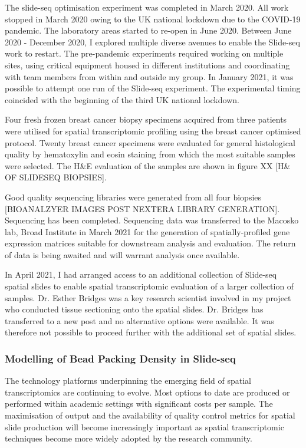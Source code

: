 The slide-seq optimisation experiment was completed in March 2020. All work stopped in March 2020 owing to the UK national lockdown due to the COVID-19 pandemic. The laboratory areas started to re-open in June 2020. Between June 2020 - December 2020, I explored multiple diverse avenues to enable the Slide-seq work to restart. The pre-pandemic experiments required working on multiple sites, using critical equipment housed in different institutions and coordinating with team members from within and outside my group. In January 2021, it was possible to attempt one run of the Slide-seq experiment. The experimental timing coincided with the beginning of the third UK national lockdown. 

Four fresh frozen breast cancer biopsy specimens acquired from three patients were utilised for spatial transcriptomic profiling using the breast cancer optimised protocol. Twenty breast cancer specimens were evaluated for general histological quality by hematoxylin and eosin  staining from which the most suitable samples were selected. The H{\&}E evaluation of the samples are shown in figure XX [H{\&} OF SLIDESEQ BIOPSIES].

Good quality sequencing libraries were generated from all four biopsies [BIOANALZYER IMAGES POST NEXTERA LIBRARY GENERATION]. Sequencing has been completed. Sequencing data was transferred to the Macosko lab, Broad Institute in March 2021 for the generation of spatially-profiled gene expression matrices suitable for downstream analysis and evaluation. The return of data is being awaited and will warrant analysis once available.

In April 2021, I had arranged access to an additional collection of Slide-seq spatial slides to enable spatial transcriptomic evaluation of a larger collection of samples. 
Dr. Esther Bridges was a key research scientist involved in my project who conducted tissue sectioning onto the spatial slides. Dr. Bridges has transferred to a new post and no alternative options were available. It was therefore not possible to proceed further with the additional set of spatial slides.


\subsubsection{Modelling of Bead Packing Density in Slide-seq}
The technology platforms underpinning the emerging field of spatial transcriptomics are continuing to evolve. Most options to date are produced or performed within academic settings with significant costs per sample. The maximisation of output and the availability of quality control metrics for spatial slide production will become increasingly important as spatial transcriptomic techniques become more widely adopted by the research community.

